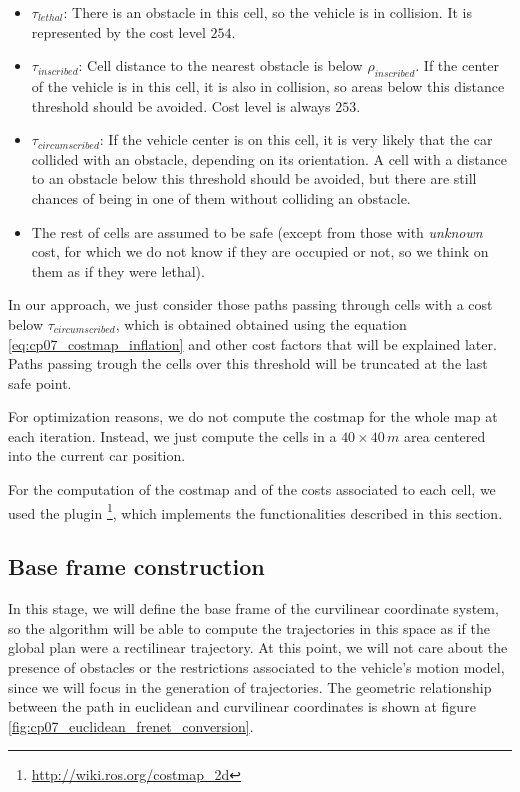 \begin{itemize}
 \item $\tau_{lethal}$: There is an obstacle in this cell, so the vehicle is in collision. It is represented by the cost level $254$.
 \item $\tau_{inscribed}$: Cell distance to the nearest obstacle is below $\rho_{inscribed}$. If the center of the vehicle is in this cell, it is also in collision, so areas below this distance threshold should be avoided. Cost level is always $253$.
 \item $\tau_{circumscribed}$: If the vehicle center is on this cell, it is very likely that the car collided with an obstacle, depending on its orientation. A cell with a distance to an obstacle below this threshold should be avoided, but there are still chances of being in one of them without colliding an obstacle. 
 \item The rest of cells are assumed to be safe (except from those with \emph{unknown} cost, for which we do not know if they are occupied or not, so we think on them as if they were lethal).
\end{itemize}

In our approach, we just consider those paths passing through cells with a cost below $\tau_{circumscribed}$, which is obtained obtained using the equation \ref{eq:cp07_costmap_inflation} and other cost factors that will be explained later. Paths passing trough the cells over this threshold will be truncated at the last safe point.

For optimization reasons, we do not compute the costmap for the whole map at each iteration. Instead, we just compute the cells in a $40 \times 40\,m$ area centered into the current car position. 

For the computation of the costmap and of the costs associated to each cell, we used the \ROS plugin \footnote{\url{http://wiki.ros.org/costmap\_2d}}, which implements the functionalities described in this section.

\subsection{Base frame construction}\label{ch:chapter07_01_02}

In this stage, we will define the base frame of the curvilinear coordinate system, so the algorithm will be able to compute the trajectories in this space as if the global plan were a rectilinear trajectory. At this point, we will not care about the presence of obstacles or the restrictions associated to the vehicle's motion model, since we will focus in the generation of trajectories. The geometric relationship between the path in euclidean and curvilinear coordinates is shown at figure \ref{fig:cp07_euclidean_frenet_conversion}.

